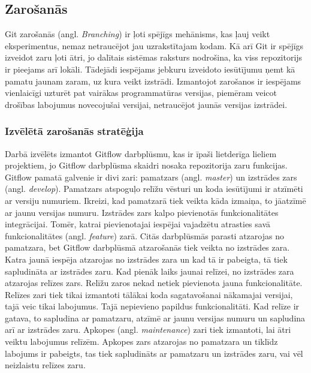 \subsection{Zarošanās} \label{Branching}
Git zarošanās (angl. \textit{Branching}) ir ļoti spējīgs mehānisms, kas ļauj veikt eksperimentus, nemaz netraucējot jau uzrakstītajam kodam. Kā arī Git ir spējīgs izveidot zaru ļoti ātri, jo dalītais sistēmas raksturs nodrošina, ka viss repozitorijs ir pieejams arī lokāli. Tādejādi iespējams jebkuru izveidoto iesūtījumu ņemt kā pamatu jaunam zaram, uz kura veikt izstrādi. Izmantojot zarošanos ir iespējams vienlaicīgi uzturēt pat vairākas programmatūras versijas, piemēram veicot drošības labojumus novecojušai versijai, netraucējot jaunās versijas izstrādei.
\subsubsection{Izvēlētā zarošanās stratēģija}
Darbā izvēlēts izmantot Gitflow darbplūsmu, kas ir īpaši lietderīga lieliem projektiem, jo Gitflow darbplūsma skaidri nosaka repozitorija zaru funkcijas. Gitflow pamatā galvenie ir divi zari: pamatzars (angl. \textit{master}) un izstrādes zars (angl. \textit{develop}). Pamatzars atspoguļo relīžu vēsturi un koda iesūtījumi ir atzīmēti ar versiju numuriem. Ikreizi, kad pamatzarā tiek veikta kāda izmaiņa, to jāatzīmē ar jaunu versijas numuru. Izstrādes zars kalpo pievienotās funkcionalitātes integrācijai. Tomēr, katrai pievienotajai iespējai vajadzētu atrasties savā funkcionalitātes (angl. \textit{feature}) zarā. Citās darbplūsmās parasti atzarojas no pamatzara, bet Gitflow darbplūsmā atzarošanās tiek veikta no izstrādes zara. Katra jaunā iespēja atzarojas no izstrādes zara un kad tā ir pabeigta, tā tiek sapludināta ar izstrādes zaru.
Kad pienāk laiks jaunai relīzei, no izstrādes zara atzarojas relīzes zars. Relīžu zaros nekad netiek pievienota jauna funkcionalitāte. Relīzes zari tiek tikai izmantoti tālākai koda sagatavošanai nākamajai versijai, tajā veic tikai labojumus. Tajā nepievieno papildus funkcionalitāti. Kad relīze ir gatava, to sapludina ar pamatzaru, atzīmē ar jaunu versijas numuru un sapludina arī ar izstrādes zaru.
Apkopes (angl. \textit{maintenance}) zari tiek izmantoti, lai ātri veiktu labojumus relīzēm. Apkopes zars atzarojas no pamatzara un tiklīdz labojums ir pabeigts, tas tiek sapludināts ar pamatzaru un izstrādes zaru, vai vēl neizlaistu relīzes zaru.

